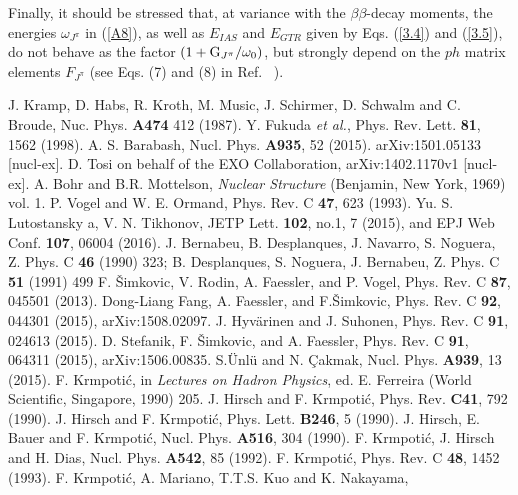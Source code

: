 \documentclass[nofootinbib,twocolumn,eqsecnum,floats,aps]{revtex4}
\def\rf#1{{(\ref{#1})}}
\def\etal {{\it et al.}}
\def\b {{\beta}}
\begin{document}
{Finally, it should be stressed that, at variance with the $\b\b$-decay moments,
the energies $\omega_{J^\pi}$
in \rf{A8}, as well as $E_{IAS}$ and $E_{GTR}$ given by  Eqs.
\rf{3.4} and \rf{3.5}, do not behave as the factor $(1+{{\rm G}_{J^\pi}}/{\omega_0})$,
but strongly depend on the $ph$ matrix elements
$F_{J^\pi}$ (see Eqs. (7) and (8) in Ref. ~\cite{Krm94a}).


\begin{thebibliography}{99}
 J. Kramp, D. Habs, R. Kroth, M. Music, J. Schirmer, D. Schwalm and C. Broude,
Nuc. Phys.   {\bf A474} 412 (1987).
  Y. Fukuda \etal,
Phys. Rev. Lett. \textbf{81}, 1562 (1998).
 A. S. Barabash,
Nucl. Phys. {\bf A935}, 52 (2015). arXiv:1501.05133 [nucl-ex].
 D. Tosi on behalf of the EXO Collaboration,
arXiv:1402.1170v1 [nucl-ex].
  A. Bohr and B.R. Mottelson, {\it Nuclear  Structure}
(Benjamin,  New York, 1969) vol. 1.
 P. Vogel and W. E. Ormand,
Phys. Rev. C {\bf47}, 623 (1993).
 Yu. S. Lutostansky a, V. N. Tikhonov,
JETP Lett. {\bf 102}, no.1, 7 (2015),
and EPJ Web Conf. {\bf 107}, 06004 (2016).
 J. Bernabeu, B. Desplanques, J. Navarro, S. Noguera, Z. Phys. C {\bf 46} (1990) 323;
B. Desplanques, S. Noguera, J. Bernabeu, Z. Phys. C {\bf  51} (1991) 499
 F. \v Simkovic,  V. Rodin, A. Faessler, and P. Vogel,
Phys. Rev. C {\bf 87}, 045501 (2013).
 Dong-Liang Fang,   A. Faessler, and
F.\v Simkovic, Phys. Rev. C {\bf92}, 044301 (2015), arXiv:1508.02097.
 J. Hyv\"arinen and J. Suhonen,
Phys. Rev. C {\bf 91}, 024613 (2015).
 D. Stefanik, F. \v Simkovic, and A. Faessler,
Phys. Rev. C {\bf91}, 064311 (2015), arXiv:1506.00835.
 S.\"Unl\"u and N. \c{C}akmak,
Nucl. Phys. {\bf A939}, 13 (2015).
 F. Krmpoti\'{c}, in {\it Lectures  on  Hadron Physics},
ed.  E. Ferreira (World Scientific, Singapore, 1990) 205.
 J. Hirsch and F. Krmpoti\'{c},
Phys. Rev. {\bf C41}, 792 (1990).
 J. Hirsch and F. Krmpoti\'{c},
Phys. Lett. {\bf B246}, 5 (1990).
 J. Hirsch, E. Bauer and F. Krmpoti\'{c},
Nucl. Phys. {\bf A516}, 304  (1990).
 F. Krmpoti\'{c}, J. Hirsch and H. Dias,
Nucl. Phys. {\bf A542}, 85 (1992).
 F. Krmpoti\'c,
Phys. Rev. C \textbf{48}, 1452 (1993).
 F. Krmpoti\'{c}, A. Mariano, T.T.S. Kuo and K. Nakayama,

\end{thebibliography}}
\end{document}
